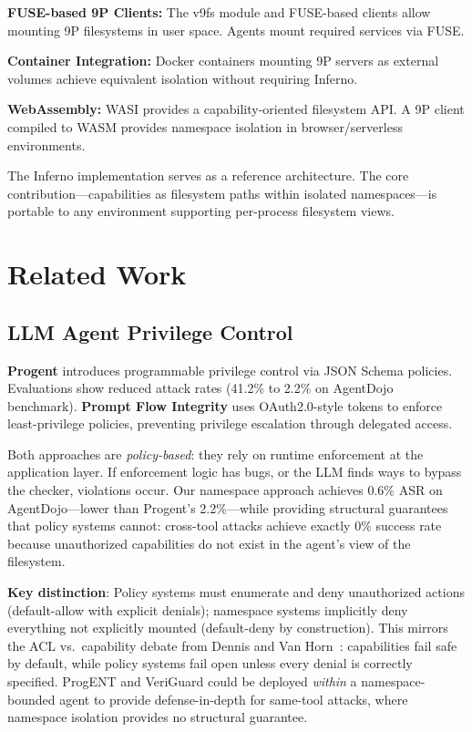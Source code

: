 \documentclass[acmsmall,screen,review]{acmart}
\begin{document}
\textbf{FUSE-based 9P Clients:} The v9fs module and FUSE-based clients allow mounting 9P filesystems in user space. Agents mount required services via FUSE.

\textbf{Container Integration:} Docker containers mounting 9P servers as external volumes achieve equivalent isolation without requiring Inferno.

\textbf{WebAssembly:} WASI provides a capability-oriented filesystem API. A 9P client compiled to WASM provides namespace isolation in browser/serverless environments.

The Inferno implementation serves as a reference architecture. The core contribution---capabilities as filesystem paths within isolated namespaces---is portable to any environment supporting per-process filesystem views.

\section{Related Work}
\label{sec:related}

\subsection{LLM Agent Privilege Control}

\textbf{Progent} \cite{shi2025progent} introduces programmable privilege control via JSON Schema policies. Evaluations show reduced attack rates (41.2\% to 2.2\% on AgentDojo benchmark). \textbf{Prompt Flow Integrity} \cite{pfi2025} uses OAuth2.0-style tokens to enforce least-privilege policies, preventing privilege escalation through delegated access.

Both approaches are \textit{policy-based}: they rely on runtime enforcement at the application layer. If enforcement logic has bugs, or the LLM finds ways to bypass the checker, violations occur. Our namespace approach achieves 0.6\% ASR on AgentDojo---lower than Progent's 2.2\%---while providing structural guarantees that policy systems cannot: cross-tool attacks achieve exactly 0\% success rate because unauthorized capabilities do not exist in the agent's view of the filesystem.

\textbf{Key distinction}: Policy systems must enumerate and deny unauthorized actions (default-allow with explicit denials); namespace systems implicitly deny everything not explicitly mounted (default-deny by construction). This mirrors the ACL vs.\ capability debate from Dennis and Van Horn~\cite{dennis1966capabilities}: capabilities fail safe by default, while policy systems fail open unless every denial is correctly specified. ProgENT and VeriGuard could be deployed \textit{within} a namespace-bounded agent to provide defense-in-depth for same-tool attacks, where namespace isolation provides no structural guarantee.
\end{document}
